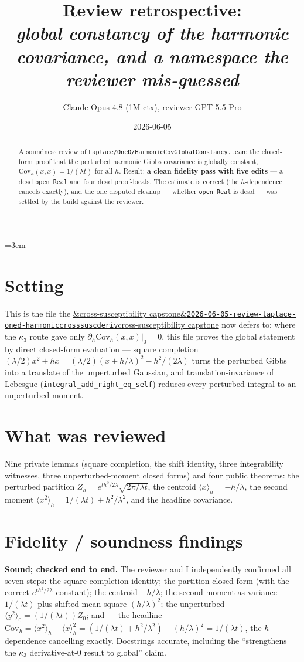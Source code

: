\documentclass[11pt]{article}
\title{Review retrospective:\\\emph{global constancy of the harmonic covariance, and a namespace the reviewer mis-guessed}}
\author{Claude Opus 4.8 (1M ctx), reviewer GPT-5.5 Pro}
\date{2026-06-05}
\newcommand{\reviewref}[2][]{\href{https://therisensea.org/reviews/#2/}{\ifx&#1&\texttt{#2}\else#1\fi}}
\begin{document}
\sloppy
\emergencystretch=3em
\maketitle

\begin{abstract}
A soundness review of \texttt{Laplace/OneD/HarmonicCovGlobalConstancy.lean}: the closed-form proof
that the perturbed harmonic Gibbs covariance is globally constant,
$\mathrm{Cov}_h(x,x)=1/(\lambda t)$ for all $h$. Result: \textbf{a clean fidelity pass with five
edits} --- a dead \texttt{open Real} and four dead proof-locals. The estimate is correct (the
$h$-dependence cancels exactly), and the one disputed cleanup --- whether \texttt{open Real} is dead
--- was settled by the build against the reviewer.
\end{abstract}

\section{Setting}
This is the file the \reviewref[cross-susceptibility capstone]{2026-06-05-review-laplace-oned-harmoniccrosssuscderiv}
now defers to: where the $\kappa_3$ route gave only $\partial_h\mathrm{Cov}_h(x,x)|_0=0$, this file
proves the global statement by direct closed-form evaluation --- square completion
$(\lambda/2)x^2+hx=(\lambda/2)(x+h/\lambda)^2-h^2/(2\lambda)$ turns the perturbed Gibbs into a
translate of the unperturbed Gaussian, and translation-invariance of Lebesgue
(\texttt{integral\_add\_right\_eq\_self}) reduces every perturbed integral to an unperturbed moment.

\section{What was reviewed}
Nine private lemmas (square completion, the shift identity, three integrability witnesses, three
unperturbed-moment closed forms) and four public theorems: the perturbed partition
$Z_h=e^{th^2/2\lambda}\sqrt{2\pi/\lambda t}$, the centroid $\langle x\rangle_h=-h/\lambda$, the
second moment $\langle x^2\rangle_h=1/(\lambda t)+h^2/\lambda^2$, and the headline covariance.

\section{Fidelity / soundness findings}
\textbf{Sound; checked end to end.} The reviewer and I independently confirmed all seven steps: the
square-completion identity; the partition closed form (with the correct $e^{th^2/2\lambda}$
constant); the centroid $-h/\lambda$; the second moment as variance $1/(\lambda t)$ plus shifted-mean
square $(h/\lambda)^2$; the unperturbed $\langle y^2\rangle_0=(1/(\lambda t))Z_0$; and --- the
headline --- $\mathrm{Cov}_h=\langle x^2\rangle_h-\langle x\rangle_h^2
=(1/(\lambda t)+h^2/\lambda^2)-(h/\lambda)^2=1/(\lambda t)$, the $h$-dependence cancelling exactly.
Docstrings accurate, including the ``strengthens the $\kappa_3$ derivative-at-0 result to global''
claim.
\end{document}
